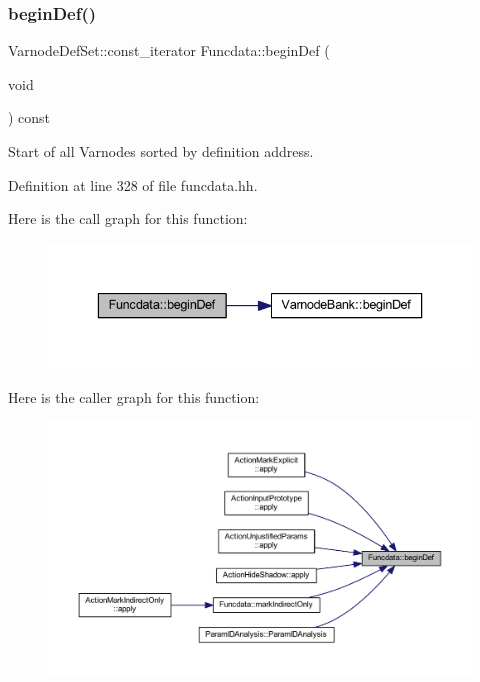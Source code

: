 \subsubsection{\texorpdfstring{beginDef()}{beginDef()}\hspace{0.1cm}{\footnotesize\ttfamily [1/3]}}
{\footnotesize\ttfamily Varnode\+Def\+Set\+::const\+\_\+iterator Funcdata\+::begin\+Def (\begin{DoxyParamCaption}\item[{void}]{ }\end{DoxyParamCaption}) const\hspace{0.3cm}{\ttfamily [inline]}}



Start of all Varnodes sorted by definition address. 



Definition at line 328 of file funcdata.\+hh.

Here is the call graph for this function\+:
\nopagebreak
\begin{figure}[H]
\begin{center}
\leavevmode
\includegraphics[width=336pt]{class_funcdata_af9350996f6f24052be034b59bfd383b2_cgraph}
\end{center}
\end{figure}
Here is the caller graph for this function\+:
\nopagebreak
\begin{figure}[H]
\begin{center}
\leavevmode
\includegraphics[width=350pt]{class_funcdata_af9350996f6f24052be034b59bfd383b2_icgraph}
\end{center}
\end{figure}
\mbox{\label{class_funcdata_a721c960a75b9ac5652a620b6195e33f5}} 
